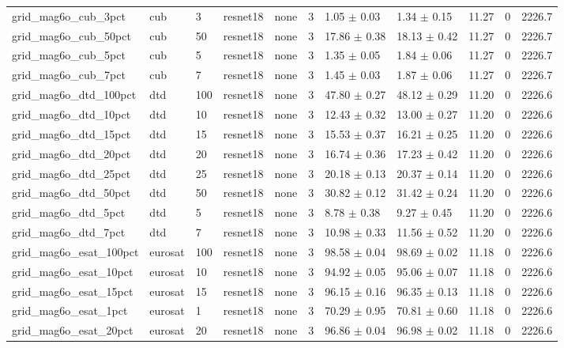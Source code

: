 \begin{tabular}{lllllllllll}
grid_mag6o_cub_3pct & cub & 3 & resnet18 & none & 3 & 1.05 $\pm$ 0.03 & 1.34 $\pm$ 0.15 & 11.27 & 0 & 2226.7 \\
grid_mag6o_cub_50pct & cub & 50 & resnet18 & none & 3 & 17.86 $\pm$ 0.38 & 18.13 $\pm$ 0.42 & 11.27 & 0 & 2226.7 \\
grid_mag6o_cub_5pct & cub & 5 & resnet18 & none & 3 & 1.35 $\pm$ 0.05 & 1.84 $\pm$ 0.06 & 11.27 & 0 & 2226.7 \\
grid_mag6o_cub_7pct & cub & 7 & resnet18 & none & 3 & 1.45 $\pm$ 0.03 & 1.87 $\pm$ 0.06 & 11.27 & 0 & 2226.7 \\
grid_mag6o_dtd_100pct & dtd & 100 & resnet18 & none & 3 & 47.80 $\pm$ 0.27 & 48.12 $\pm$ 0.29 & 11.20 & 0 & 2226.6 \\
grid_mag6o_dtd_10pct & dtd & 10 & resnet18 & none & 3 & 12.43 $\pm$ 0.32 & 13.00 $\pm$ 0.27 & 11.20 & 0 & 2226.6 \\
grid_mag6o_dtd_15pct & dtd & 15 & resnet18 & none & 3 & 15.53 $\pm$ 0.37 & 16.21 $\pm$ 0.25 & 11.20 & 0 & 2226.6 \\
grid_mag6o_dtd_20pct & dtd & 20 & resnet18 & none & 3 & 16.74 $\pm$ 0.36 & 17.23 $\pm$ 0.42 & 11.20 & 0 & 2226.6 \\
grid_mag6o_dtd_25pct & dtd & 25 & resnet18 & none & 3 & 20.18 $\pm$ 0.13 & 20.37 $\pm$ 0.14 & 11.20 & 0 & 2226.6 \\
grid_mag6o_dtd_50pct & dtd & 50 & resnet18 & none & 3 & 30.82 $\pm$ 0.12 & 31.42 $\pm$ 0.24 & 11.20 & 0 & 2226.6 \\
grid_mag6o_dtd_5pct & dtd & 5 & resnet18 & none & 3 & 8.78 $\pm$ 0.38 & 9.27 $\pm$ 0.45 & 11.20 & 0 & 2226.6 \\
grid_mag6o_dtd_7pct & dtd & 7 & resnet18 & none & 3 & 10.98 $\pm$ 0.33 & 11.56 $\pm$ 0.52 & 11.20 & 0 & 2226.6 \\
grid_mag6o_esat_100pct & eurosat & 100 & resnet18 & none & 3 & 98.58 $\pm$ 0.04 & 98.69 $\pm$ 0.02 & 11.18 & 0 & 2226.6 \\
grid_mag6o_esat_10pct & eurosat & 10 & resnet18 & none & 3 & 94.92 $\pm$ 0.05 & 95.06 $\pm$ 0.07 & 11.18 & 0 & 2226.6 \\
grid_mag6o_esat_15pct & eurosat & 15 & resnet18 & none & 3 & 96.15 $\pm$ 0.16 & 96.35 $\pm$ 0.13 & 11.18 & 0 & 2226.6 \\
grid_mag6o_esat_1pct & eurosat & 1 & resnet18 & none & 3 & 70.29 $\pm$ 0.95 & 70.81 $\pm$ 0.60 & 11.18 & 0 & 2226.6 \\
grid_mag6o_esat_20pct & eurosat & 20 & resnet18 & none & 3 & 96.86 $\pm$ 0.04 & 96.98 $\pm$ 0.02 & 11.18 & 0 & 2226.6 \\

\end{tabular}
